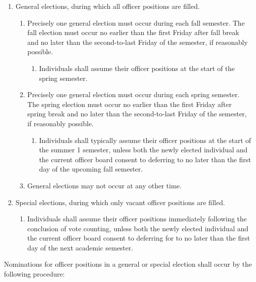 \documentclass[11pt]{article}
\newcounter{h1}
\newcounter{h2}[h1]
\newcounter{h3}[h2]
\begin{document}
\begin{enumerate}
  \item General elections, during which all officer positions are filled.  
  \begin{enumerate}
    \item Precisely one general election must occur during each fall semester. The fall election must occur no earlier than the first Friday after fall break and no later than the second-to-last Friday of the semester, if reasonably possible.  
    \begin{enumerate}
      \item Individuals shall assume their officer positions at the start of the spring semester.  
    \end{enumerate}
    \item Precisely one general election must occur during each spring semester. The spring election must occur no earlier than the first Friday after spring break and no later than the second-to-last Friday of the semester, if reasonably possible.  
    \begin{enumerate}
      \item Individuals shall typically assume their officer positions at the start of the summer 1 semester, unless both the newly elected individual and the current officer board consent to deferring to no later than the first day of the upcoming fall semester.  
    \end{enumerate}
    \item General elections may not occur at any other time.  
  \end{enumerate}
  \item Special elections, during which only vacant officer positions are filled.  
  \begin{enumerate}
    \item Individuals shall assume their officer positions immediately following the conclusion of vote counting, unless both the newly elected individual and the current officer board consent to deferring for to no later than the first day of the next academic semester.
  \end{enumerate}
\end{enumerate}


Nominations for officer positions in a general or special election shall occur by the following procedure:
\end{document}
